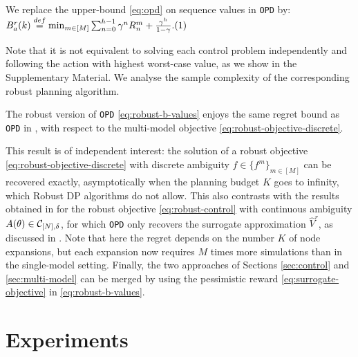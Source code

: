 \documentclass{article}
\begin{document}
\begin{definition} We replace the upper-bound \eqref{eq:opd} on sequence values in \texttt{OPD} by: \hfill
$
B_a^r(k)  \eqdef \min_{m\in[M]} \sum_{n=0}^{h-1} \gamma^n R_n^m  + \frac{\gamma^h}{1-\gamma}. \refstepcounter{equation}\hfill(\theequation)\label{eq:robust-b-values}
$
\end{definition}
Note that it is not equivalent to solving each control problem independently and following the action with highest worst-case value, as we show in the Supplementary Material. We analyse the sample complexity of the corresponding robust planning algorithm.


\begin{theorem}
\label{theorem:drop-regret}
The robust version of \texttt{OPD} \eqref{eq:robust-b-values} enjoys the same regret bound as \texttt{OPD} in , with respect to the multi-model objective \eqref{eq:robust-objective-discrete}.
\end{theorem}

This result is of independent interest: the solution of a robust objective \eqref{eq:robust-objective-discrete} with discrete ambiguity $f\in\{f^m\}_{m\in[M]}$ can be recovered exactly, asymptotically when the planning budget $K$ goes to infinity, which Robust DP algorithms do not allow. This also contrasts with the results obtained in  for the robust objective \eqref{eq:robust-control} with continuous ambiguity $A(\theta)\in\mathcal{C}_{[N],\delta}$, for which \texttt{OPD} only recovers the surrogate approximation $\hat{V}^r$, as discussed in . Note that here the regret depends on the number $K$ of node expansions, but each expansion now requires $M$ times more simulations than in the single-model setting. Finally, the two approaches of Sections \ref{sec:control} and \ref{sec:multi-model} can be merged by using the pessimistic reward \eqref{eq:surrogate-objective} in \eqref{eq:robust-b-values}.

\section{Experiments}
\label{sec:experiments}
\end{document}
